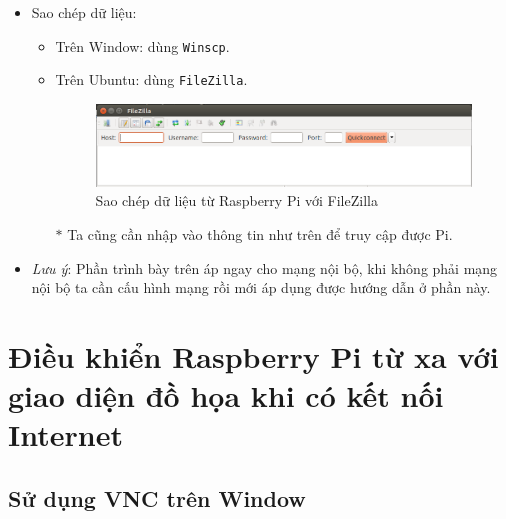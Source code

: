 \begin{itemize}
\item Sao chép dữ liệu:
\begin{itemize}
\item Trên Window: dùng \verb|Winscp|.
\item Trên Ubuntu: dùng \verb|FileZilla|.
\begin{figure}[!h]
\begin{center}
\includegraphics[scale=.45]{remote/images/FileZilla}
\end{center}
\caption{Sao chép dữ liệu từ Raspberry Pi với FileZilla}
\end{figure}
\item[$\ast$] Ta cũng cần nhập vào thông tin như trên để truy cập được Pi.
\end{itemize}
\item \textit{Lưu ý}: Phần trình bày trên áp ngay cho mạng nội bộ, khi không phải mạng nội bộ ta cần cấu hình mạng rồi mới áp dụng được hướng dẫn ở phần này.
\end{itemize}
\section{Điều khiển Raspberry Pi từ xa với giao diện đồ họa khi có kết nối Internet}
\subsection{Sử dụng VNC trên Window}
